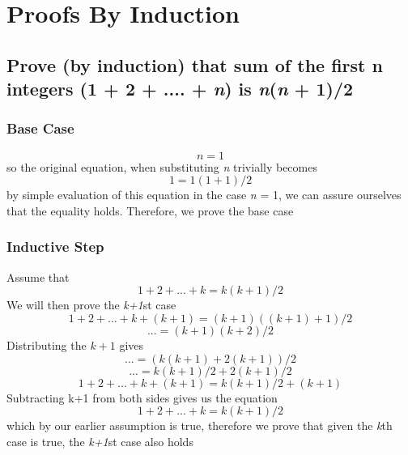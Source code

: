 \documentclass[titlepage]{article}
\numberwithin{equation}{subsection}
\begin{document}
\section{Proofs By Induction}
\subsection{Prove (by induction) that sum of 
the first n integers (1 + 2 + .... + \textit{n}) is \textit{n}(\textit{n} + 1)/2 }
\subsubsection{Base Case}
\begin{equation}
    n = 1
\end{equation}
so the original equation, when substituting \textit{n} trivially becomes
\begin{equation}
    1 = 1(1 + 1) / 2
\end{equation}
by simple evaluation of this equation in the case \textit{n} = 1, we can assure ourselves
that the equality holds. Therefore, we prove the base case

\subsubsection{Inductive Step}
Assume that
\begin{equation}
    1 + 2 + ... + k = k(k + 1)/ 2
\end{equation}
We will then prove the \textit{k+1}st case
\begin{equation}
    1 + 2 + ... + k + (k+1) = (k+1)((k+1)+1)/2
\end{equation}
\begin{equation}
    ... = (k+1)(k+2)/2
\end{equation}
Distributing the $k+1$ gives
\begin{equation}
    ... = (k(k+1) + 2(k+1))/2
\end{equation}
\begin{equation}
    ... = k(k+1)/2 + 2(k+1)/2
\end{equation}
\begin{equation}
    1 + 2 + ... + k + (k+1) = k(k+1)/2 + (k+1)
\end{equation}
Subtracting k+1 from both sides gives us the equation
\begin{equation}
    1 + 2 + ... + k = k(k+1)/2
\end{equation}
which by our earlier assumption is true, therefore we prove
that given the \textit{k}th case is true, the \textit{k+1}st case also holds
\end{document}

